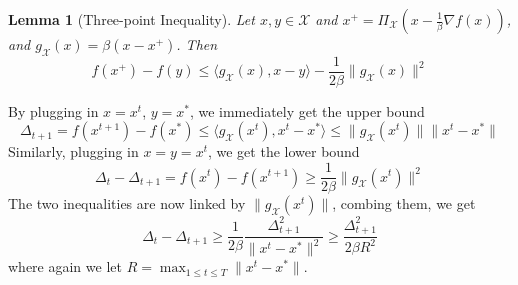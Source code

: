 \documentclass{scrartcl}
\newtheorem{lemma}{Lemma}
\newcommand{\sX}{\mathcal{X}}
\begin{document}
\begin{lemma}[Three-point Inequality]
Let $x,y\in\sX$ and $x^+=\Pi_\sX\left(x-\frac{1}{\beta}\nabla f(x)\right)$, and $g_\sX(x)=\beta
(x-x^+)$. Then
\begin{equation}
  f(x^+)-f(y) \leq \langle g_\sX(x), x-y\rangle - \frac{1}{2\beta}\|g_\sX(x)\|^2
\end{equation}
\end{lemma}

By plugging in $x=x^t$, $y=x^*$, we immediately get the upper bound
\begin{equation}
  \Delta_{t+1} = f(x^{t+1})-f(x^*) \leq \langle g_\sX(x^t),x^t-x^*\rangle
  \leq \|g_\sX(x^t)\|\|x^t-x^*\|
\end{equation}
Similarly, plugging in $x=y=x^t$, we get the lower bound
\begin{equation}
\Delta_t - \Delta_{t+1} = f(x^t)-f(x^{t+1}) \geq \frac{1}{2\beta}\|g_\sX(x^t)\|^2
\end{equation}
The two inequalities are now linked by $\|g_\sX(x^t)\|$, combing them, we get
\[
  \Delta_t - \Delta_{t+1} \geq \frac{1}{2\beta} \frac{\Delta_{t+1}^2}{\|x^t-x^*\|^2}
  \geq \frac{\Delta_{t+1}^2}{2\beta R^2}
\]
where again we let $R=\max_{1\leq t\leq T}\|x^t-x^*\|$.



\end{document}
